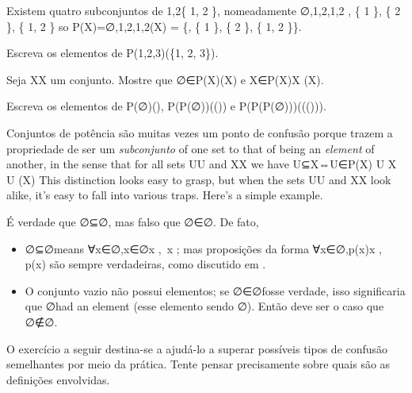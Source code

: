 \begin{example}
Existem quatro subconjuntos de {1,2}\{ 1, 2 \}, nomeadamente
∅,{1},{2},{1,2} \varnothing, \quad \{ 1 \}, \quad \{ 2 \}, \quad \{ 1, 2 \} 
so P(X)={∅,{1},{2},{1,2}}(X) = \{\varnothing, \{ 1 \}, \{ 2 \}, \{ 1, 2 \}\}.
\end{example}

\begin{exercise}
Escreva os elementos de P({1,2,3})(\{1, 2, 3\}).
\end{exercise}

\begin{exercise}
Seja XX um conjunto. Mostre que ∅∈P(X)\varnothing \in {}(X) e X∈P(X)X \in {}(X).
\end{exercise}

\begin{exercise}
Escreva os elementos de P(∅)(\varnothing), P(P(∅))((\varnothing)) e P(P(P(∅)))(((\varnothing))).
\end{exercise}

Conjuntos de potência são muitas vezes um ponto de confusão porque trazem a propriedade de ser um \textit{subconjunto} of one set to that of being an \textit{element} of another, in the sense that for all sets UU and XX we have
U⊆X⇔U∈P(X) U \subseteq X \quad \Leftrightarrow \quad U \in {}(X) 
This distinction looks easy to grasp, but when the sets UU and XX look alike, it's easy to fall into various traps. Here's a simple example.

\begin{example}
É verdade que ∅⊆∅\varnothing \subseteq \varnothing, mas falso que ∅∈∅\varnothing \in \varnothing. De fato,
\begin{itemize}
\item ∅⊆∅\varnothing \subseteq \varnothing means ∀x∈∅,x∈∅\forall x \in \varnothing,\, x \in \varnothing; mas proposições da forma ∀x∈∅,p(x)\forall x \in \varnothing,\, p(x) são sempre verdadeiras, como discutido em .
\item O conjunto vazio não possui elementos; se ∅∈∅\varnothing \in \varnothing fosse verdade, isso significaria que ∅\varnothing had an element (esse elemento sendo ∅\varnothing). Então deve ser o caso que ∅∉∅\varnothing \not \in \varnothing.
\end{itemize}
\end{example}

O exercício a seguir destina-se a ajudá-lo a superar possíveis tipos de confusão semelhantes por meio da prática. Tente pensar precisamente sobre quais são as definições envolvidas.

